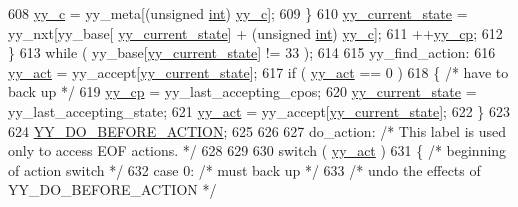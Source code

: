 \begin{DoxyCode}
608                                         \mbox{\hyperlink{expr-lex_8cpp_a2ce7598a28e3deb63b5ef934b031a93f}{yy\_c}} = yy\_meta[(\textcolor{keywordtype}{unsigned} \mbox{\hyperlink{_util_8cpp_a0ef32aa8672df19503a49fab2d0c8071}{int}}) 
      \mbox{\hyperlink{expr-lex_8cpp_a2ce7598a28e3deb63b5ef934b031a93f}{yy\_c}}];
609                                 \}
610                         \mbox{\hyperlink{expr-lex_8cpp_abb8b9672f94e21056888ae611b41cd1b}{yy\_current\_state}} = yy\_nxt[yy\_base[
      \mbox{\hyperlink{expr-lex_8cpp_abb8b9672f94e21056888ae611b41cd1b}{yy\_current\_state}}] + (\textcolor{keywordtype}{unsigned} \mbox{\hyperlink{_util_8cpp_a0ef32aa8672df19503a49fab2d0c8071}{int}}) \mbox{\hyperlink{expr-lex_8cpp_a2ce7598a28e3deb63b5ef934b031a93f}{yy\_c}}];
611                         ++\mbox{\hyperlink{expr-lex_8cpp_aebf8322d98e81db5af081bb22a5f06fe}{yy\_cp}};
612                         \}
613                 \textcolor{keywordflow}{while} ( yy\_base[\mbox{\hyperlink{expr-lex_8cpp_abb8b9672f94e21056888ae611b41cd1b}{yy\_current\_state}}] != 33 );
614 
615 yy\_find\_action:
616                 \mbox{\hyperlink{expr-lex_8cpp_a7ffc8c947830757dd87ad202a6823edd}{yy\_act}} = yy\_accept[\mbox{\hyperlink{expr-lex_8cpp_abb8b9672f94e21056888ae611b41cd1b}{yy\_current\_state}}];
617                 \textcolor{keywordflow}{if} ( \mbox{\hyperlink{expr-lex_8cpp_a7ffc8c947830757dd87ad202a6823edd}{yy\_act}} == 0 )
618                         \{ \textcolor{comment}{/* have to back up */}
619                         \mbox{\hyperlink{expr-lex_8cpp_aebf8322d98e81db5af081bb22a5f06fe}{yy\_cp}} = yy\_last\_accepting\_cpos;
620                         \mbox{\hyperlink{expr-lex_8cpp_abb8b9672f94e21056888ae611b41cd1b}{yy\_current\_state}} = yy\_last\_accepting\_state;
621                         \mbox{\hyperlink{expr-lex_8cpp_a7ffc8c947830757dd87ad202a6823edd}{yy\_act}} = yy\_accept[\mbox{\hyperlink{expr-lex_8cpp_abb8b9672f94e21056888ae611b41cd1b}{yy\_current\_state}}];
622                         \}
623 
624                 \mbox{\hyperlink{expr-lex_8cpp_acc3486d769af4e4b2820346a0093cc79}{YY\_DO\_BEFORE\_ACTION}};
625 
626 
627 do\_action:      \textcolor{comment}{/* This label is used only to access EOF actions. */}
628 
629 
630                 \textcolor{keywordflow}{switch} ( \mbox{\hyperlink{expr-lex_8cpp_a7ffc8c947830757dd87ad202a6823edd}{yy\_act}} )
631         \{ \textcolor{comment}{/* beginning of action switch */}
632                         \textcolor{keywordflow}{case} 0: \textcolor{comment}{/* must back up */}
633                         \textcolor{comment}{/* undo the effects of YY\_DO\_BEFORE\_ACTION */}

\end{DoxyCode}
